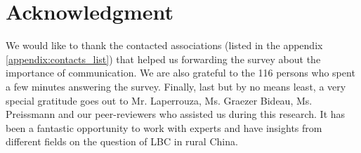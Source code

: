 \documentclass[conference]{IEEEtran}
\begin{document}





\section*{Acknowledgment}
We would like to thank the contacted associations (listed in the appendix \ref{appendix:contacts_list}) that helped us forwarding the survey about the importance of communication. We are also grateful to the 116 persons who spent a few minutes answering the survey. Finally, last but by no means least, a very special gratitude goes out to Mr. Laperrouza,  Ms. Graezer Bideau, Ms. Preissmann and our peer-reviewers who assisted us during this research. It has been a fantastic opportunity to work with experts and have insights from different fields on the question of LBC in rural China. 

\printbibliography

\vfill
\listoffigures

\listoftables

\clearpage

\end{document}
